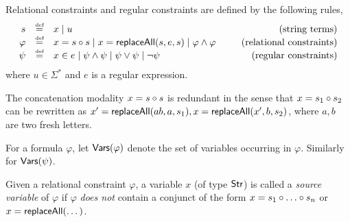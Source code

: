 \begin{definition}
	Relational constraints and regular constraints are defined by the following rules,
	\[
	\begin{array}{r c l cr}
	s &\eqdef & x \mid u & \ \ & \mbox{(string terms)}\\
	\varphi &\eqdef & x = s \concat s  \mid  x = \replaceall(s, e, s) \mid \varphi \wedge \varphi & \ \ & \mbox{(relational constraints)}\\
	\psi & \eqdef & x \in e \mid \psi \wedge \psi \mid \psi \vee \psi \mid \neg \psi   & \ \ & \mbox{(regular constraints)} \\
	\end{array}
	\]
	where $u \in \Sigma^\ast$ and $e$ is a regular expression. 
\end{definition}

\begin{remark}\label{rem-concat}
The concatenation modality $x = s \circ s$ is redundant in the sense that $x = s_1 \circ s_2$ can be rewritten as $x' = \mathsf{replaceAll}(ab, a, s_1), x = \mathsf{replaceAll}(x', b, s_2)$, where $a,b$ are two fresh letters.
\end{remark}


For a formula $\varphi$, let $\mathsf{Vars}(\varphi)$ denote the set of variables occurring in $\varphi$. Similarly for $\mathsf{Vars}(\psi)$.



Given a relational constraint $\varphi$, a variable $x$ (of type ${\sf Str}$) is called a \emph{source variable} of $\varphi$ if $\varphi$ \emph{does not} contain a conjunct of the form $x = s_1 \concat \dots \concat s_n$ or $x = \mathsf{replaceAll}(\dots)$.




